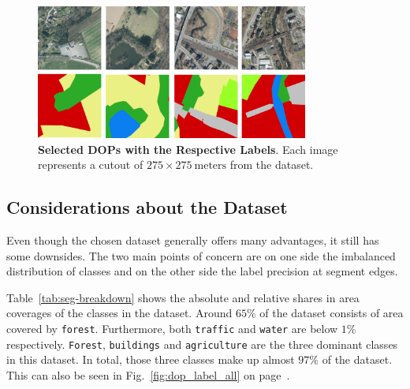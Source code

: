\begin{figure}[b]
    \centering
    \includegraphics[width=0.8\textwidth]{images/dop_plus_label}
    \caption[Selected DOPs with the Respective Labels]
    {\textbf{Selected DOPs with the Respective Labels}. Each image represents a cutout of $275\times 275~\text{meters}$ from the dataset. }
    \label{fig:dop_with_labels}
\end{figure}

\subsection{Considerations about the Dataset}
\label{sec:dataset_considerations}

Even though the chosen dataset generally offers many advantages, it still has some downsides. The two main points of concern are on one side the imbalanced distribution of classes and on the other side the label precision at segment edges.

Table~\ref{tab:seg-breakdown} shows the absolute and relative shares in area coverages of the classes in the dataset. Around $65\%$ of the dataset consists of area covered by \texttt{forest}. Furthermore, both \texttt{traffic} and \texttt{water} are below $1\%$ respectively. \texttt{Forest}, \texttt{buildings} and \texttt{agriculture} are the three dominant classes in this dataset. In total, those three classes make up almost $97\%$ of the dataset. This can also be seen in Fig.~\ref{fig:dop_label_all} on page~\pageref{fig:dop_label_all}.

